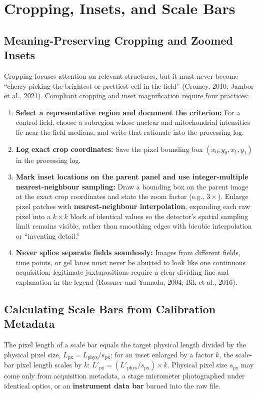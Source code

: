 \section{Cropping, Insets, and Scale Bars}

\subsection{Meaning-Preserving Cropping and Zoomed Insets}

Cropping focuses attention on relevant structures, but it must never become ``cherry-picking the brightest or prettiest cell in the field'' (Cromey, 2010; Jambor et al., 2021). Compliant cropping and inset magnification require four practices:
\begin{enumerate}
\item \textbf{Select a representative region and document the criterion:} For a control field, choose a subregion whose nuclear and mitochondrial intensities lie near the field medians, and write that rationale into the processing log.
\item \textbf{Log exact crop coordinates:} Save the pixel bounding box $(x_0, y_0, x_1, y_1)$ in the processing log.
\item \textbf{Mark inset locations on the parent panel and use integer-multiple nearest-neighbour sampling:} Draw a bounding box on the parent image at the exact crop coordinates and state the zoom factor (e.g., $3\times$). Enlarge pixel patches with \textbf{nearest-neighbour interpolation}, expanding each raw pixel into a $k \times k$ block of identical values so the detector's spatial sampling limit remains visible, rather than smoothing edges with bicubic interpolation or ``inventing detail.''
\item \textbf{Never splice separate fields seamlessly:} Images from different fields, time points, or gel lanes must never be abutted to look like one continuous acquisition; legitimate juxtapositions require a clear dividing line and explanation in the legend (Rossner and Yamada, 2004; Bik et al., 2016).
\end{enumerate}

\subsection{Calculating Scale Bars from Calibration Metadata}

The pixel length of a scale bar equals the target physical length divided by the physical pixel size, $L_{\text{px}} = L_{\text{phys}} / s_{\text{px}}$; for an inset enlarged by a factor $k$, the scale-bar pixel length scales by $k$: $L'_{\text{px}} = (L'_{\text{phys}} / s_{\text{px}}) \times k$. Physical pixel size $s_{\text{px}}$ may come only from acquisition metadata, a stage micrometer photographed under identical optics, or an \textbf{instrument data bar} burned into the raw file.

